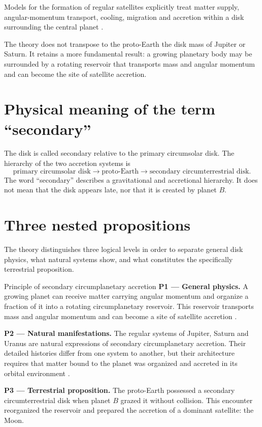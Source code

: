 \documentclass[11pt,a4paper,openany]{report}
\begin{document}
Models for the formation of regular satellites explicitly treat matter supply, angular-momentum
transport, cooling, migration and accretion within a disk surrounding the central planet
\cite{CanupWard2002,CanupWard2006,Nimmo2026}.

\begin{ideephys}
The theory does not transpose to the proto-Earth the disk mass of Jupiter or Saturn. It retains a
more fundamental result: a growing planetary body may be surrounded by a rotating reservoir that
transports mass and angular momentum and can become the site of satellite accretion.
\end{ideephys}

\section{Physical meaning of the term ``secondary''}

The disk is called secondary relative to the primary circumsolar disk. The hierarchy of the two
accretion systems is
\begin{equation}
\text{primary circumsolar disk}\longrightarrow\text{proto-Earth}\longrightarrow
\text{secondary circumterrestrial disk.}
\label{eq:hierarchie}
\end{equation}
The word ``secondary'' describes a gravitational and accretional hierarchy. It does not mean that
the disk appears late, nor that it is created by planet $B$.

\section{Three nested propositions}

The theory distinguishes three logical levels in order to separate general disk physics, what
natural systems show, and what constitutes the specifically terrestrial proposition.

\begin{principe}{Principle of secondary circumplanetary accretion}
\textbf{P1 --- General physics.} A growing planet can receive matter carrying angular momentum and
organize a fraction of it into a rotating circumplanetary reservoir. This reservoir transports mass
and angular momentum and can become a site of satellite accretion \cite{Pringle1981,CanupWard2002,CanupWard2006}.

\smallskip
\textbf{P2 --- Natural manifestations.} The regular systems of Jupiter, Saturn and Uranus are
natural expressions of secondary circumplanetary accretion. Their detailed histories differ from
one system to another, but their architecture requires that matter bound to the planet was
organized and accreted in its orbital environment \cite{Nimmo2026,Blanc2025,Helled2020}.

\smallskip
\textbf{P3 --- Terrestrial proposition.} The proto-Earth possessed a secondary circumterrestrial disk
when planet $B$ grazed it without collision. This encounter reorganized the reservoir and prepared
the accretion of a dominant satellite: the Moon.
\end{principe}
\end{document}
